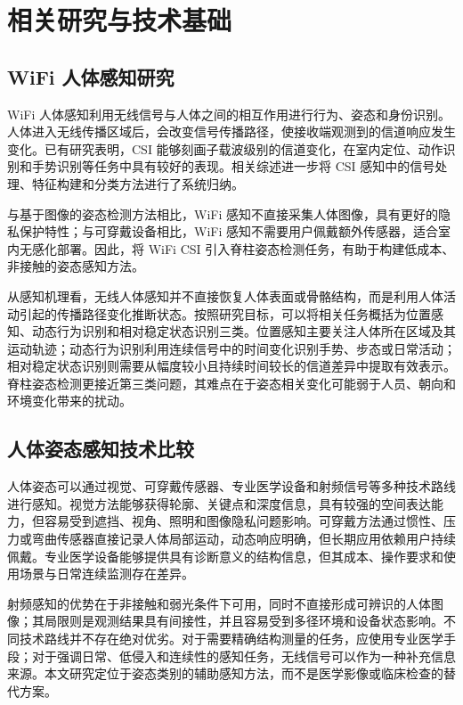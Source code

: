 ﻿%

\chapter{相关研究与技术基础}
\label{chap:related}

\section{WiFi 人体感知研究}
WiFi 人体感知利用无线信号与人体之间的相互作用进行行为、姿态和身份识别。人体进入无线传播区域后，会改变信号传播路径，使接收端观测到的信道响应发生变化。已有研究表明，CSI 能够刻画子载波级别的信道变化，在室内定位、动作识别和手势识别等任务中具有较好的表现\cite{halperin2011csi,indotrack2017,signfi2018,eeyes2014,carm2015}。相关综述进一步将 CSI 感知中的信号处理、特征构建和分类方法进行了系统归纳\cite{survey2019}。

与基于图像的姿态检测方法相比，WiFi 感知不直接采集人体图像，具有更好的隐私保护特性；与可穿戴设备相比，WiFi 感知不需要用户佩戴额外传感器，适合室内无感化部署。因此，将 WiFi CSI 引入脊柱姿态检测任务，有助于构建低成本、非接触的姿态感知方法。

从感知机理看，无线人体感知并不直接恢复人体表面或骨骼结构，而是利用人体活动引起的传播路径变化推断状态。按照研究目标，可以将相关任务概括为位置感知、动态行为识别和相对稳定状态识别三类。位置感知主要关注人体所在区域及其运动轨迹；动态行为识别利用连续信号中的时间变化识别手势、步态或日常活动；相对稳定状态识别则需要从幅度较小且持续时间较长的信道差异中提取有效表示。脊柱姿态检测更接近第三类问题，其难点在于姿态相关变化可能弱于人员、朝向和环境变化带来的扰动。

\section{人体姿态感知技术比较}
人体姿态可以通过视觉、可穿戴传感器、专业医学设备和射频信号等多种技术路线进行感知。视觉方法能够获得轮廓、关键点和深度信息，具有较强的空间表达能力，但容易受到遮挡、视角、照明和图像隐私问题影响。可穿戴方法通过惯性、压力或弯曲传感器直接记录人体局部运动，动态响应明确，但长期应用依赖用户持续佩戴。专业医学设备能够提供具有诊断意义的结构信息，但其成本、操作要求和使用场景与日常连续监测存在差异。

射频感知的优势在于非接触和弱光条件下可用，同时不直接形成可辨识的人体图像；其局限则是观测结果具有间接性，并且容易受到多径环境和设备状态影响。不同技术路线并不存在绝对优劣。对于需要精确结构测量的任务，应使用专业医学手段；对于强调日常、低侵入和连续性的感知任务，无线信号可以作为一种补充信息来源。本文研究定位于姿态类别的辅助感知方法，而不是医学影像或临床检查的替代方案。

